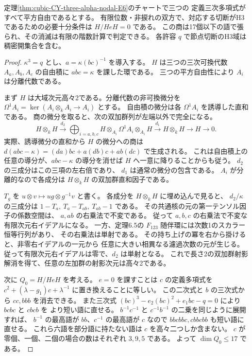 \begin{theorem}\label{thm:cubic-CY-three-alpha-nodal-E6-separable}
定理\ref{thm:cubic-CY-three-alpha-nodal-E6}のチャートで三つの
定義三次多項式がすべて平方自由であるとする。
有限位数・非捩れの双方で、対応する切断がH3であるための必要十分条件は
$H/HeH=0$ である。
この商は17個以下の語で張られ、その消滅は有限の階数計算で判定できる。
各許容 $q$ で節点切断のH3域は稠密開集合を含む。
\end{theorem}
\begin{proof}
$\kappa^3=q$ とし、$a=\kappa(bc)^{-1}$ を導入する。
$H$ は三つの三次可換代数 $A_a,A_b,A_c$ の自由積に
$abc=\kappa$ を課した環である。
三つの平方自由性により $A_i$ は分離代数である。

まず $H$ は大域次元高々2である。分離代数の非可換微分を
$\Omega^1 A_i=\ker(A_i\otimes_k A_i\to A_i)$ とする。
自由積の微分は各 $\Omega^1 A_i$ を誘導した直和である。
商の微分を取ると、次の双加群列が左端以外で完全になる。
\[
 H\otimes_k H
 \xrightarrow{d_2} \bigoplus_{i=a,b,c}
       H\otimes_{A_i}\Omega^1 A_i\otimes_{A_i}H
 \xrightarrow{d_1} H\otimes_k H \longrightarrow H\longrightarrow0 .
\]
実際、誘導微分の直和から $H$ の微分への商は
$d(abc-\kappa)=(da)bc+a(db)c+ab(dc)$ で生成される。
これは自由積上の任意の導分が、$abc-\kappa$ の導分を消せば
$H$ へ一意に降りることからも従う。
$d_2$ の三成分はこの三項の左右倍であり、
$d_1$ は通常の微分の包含である。
$A_i$ が分離的なので各成分は $H\otimes_k H$ の双加群直和因子である。

$T_g$ を $u\otimes v\mapsto ug\otimes g^{-1}v$ と書く。
各成分を $H\otimes_k H$ に埋め込んで見ると、
$d_2/\kappa$ の三成分は $1-T_a,\ T_a-T_{ab},\ T_{ab}-1$ である。
その共通核の元の第一テンソル因子の係数空間は、
$a,ab$ の右乗法で不変である。
従って $a,b,c$ の右乗法で不変な有限次元右イデアルになる。
一方、定理6.5の $F_{123}$ 随伴環には次数1のスカラー恒等行列があり、
その右乗法は単射である。
その持ち上げの冪を右から掛けると、非零右イデアルの一元から
任意に大きい相異なる濾過次数の元が生じる。
従って有限次元右イデアルは零で、$d_2$ は単射となる。
これで長さ2の双加群射影解消を得て、任意の左加群の射影次元は高々2である。

次に $Q_0=H/HeH$ を考える。
$e=0$ を課すことは $c$ の定義多項式を
$c^2+(\lambda-g_1)c+\lambda^{-1}$ に置き換えることに等しい。
この二次式と $b$ の三次式から $cc,bbb$ を消去できる。
また三次式 $(bc)^3-e_2(bc)^2+e_1bc-q=0$ により $bcbc$ と $cbcb$ を
より短い語に直せる。
$b^{-1}c^{-1}$ と $c^{-1}b^{-1}$ の二乗を同じように展開すれば、
$b^{-1}$ の最高語が $bb$、$c^{-1}$ の最高語が $c$ なので
$bbcbbc,cbbcbb$ も短い語に直せる。
これら六語を部分語に持たない語は $c$ を高々二つしか含まない。
$c$ が零個、一個、二個の場合の数はそれぞれ $3,9,5$ である。
よって $\dim Q_0\le17$ である。


\end{proof}
